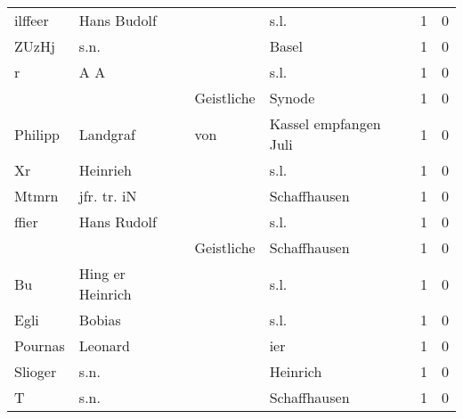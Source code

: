 \begin{tabular}{llllrr}
                  ilffeer &                        Hans Budolf &             &                                        s.l. &          1 &         0 \\
                    ZUzHj &                               s.n. &             &                                       Basel &          1 &         0 \\
                        r &                                A A &             &                                        s.l. &          1 &         0 \\
                          &                                    &  Geistliche &                                      Synode &          1 &         0 \\
                  Philipp &                           Landgraf &         von &                       Kassel empfangen Juli &          1 &         0 \\
                       Xr &                           Heinrieh &             &                                        s.l. &          1 &         0 \\
                    Mtmrn &                        jfr. tr. iN &             &                                Schaffhausen &          1 &         0 \\
                    ffier &                        Hans Rudolf &             &                                        s.l. &          1 &         0 \\
                          &                                    &  Geistliche &                                Schaffhausen &          1 &         0 \\
                       Bu &                   Hing er Heinrich &             &                                        s.l. &          1 &         0 \\
                     Egli &                             Bobias &             &                                        s.l. &          1 &         0 \\
                  Pournas &                            Leonard &             &                                         ier &          1 &         0 \\
                  Slioger &                               s.n. &             &                                    Heinrich &          1 &         0 \\
                        T &                               s.n. &             &                                Schaffhausen &          1 &         0 \\

\end{tabular}
